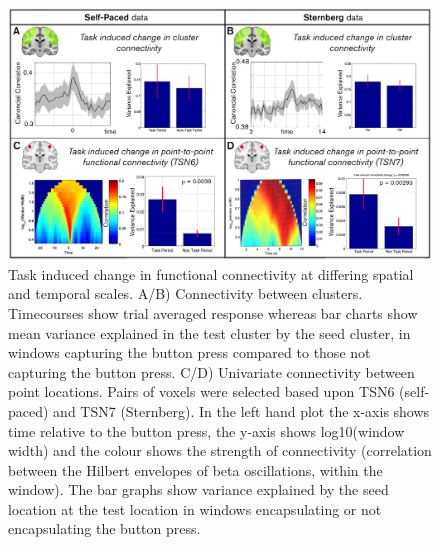 \begin{landscape}
	\begin{figure}
		\begin{center}
			\includegraphics[width=0.8\linewidth]{./images/chapter5/Figure_6.png}
			\caption{Task induced change in functional connectivity at differing spatial and temporal scales. A/B) Connectivity between clusters. Timecourses show trial averaged response whereas bar charts show mean variance explained in the test cluster by the seed cluster, in windows capturing the button press compared to those not capturing the button press. C/D) Univariate connectivity between point locations. Pairs of voxels were selected based upon TSN6 (self-paced) and TSN7 (Sternberg). In the left hand plot the x-axis shows time relative to the button press, the y-axis shows log10(window width) and the colour shows the strength of connectivity (correlation between the Hilbert envelopes of beta oscillations, within the window). The bar graphs show variance explained by the seed location at the test location in windows encapsulating or not encapsulating the button press. \label{figure_5_6}}
		\end{center}
	\end{figure}
\end{landscape}

